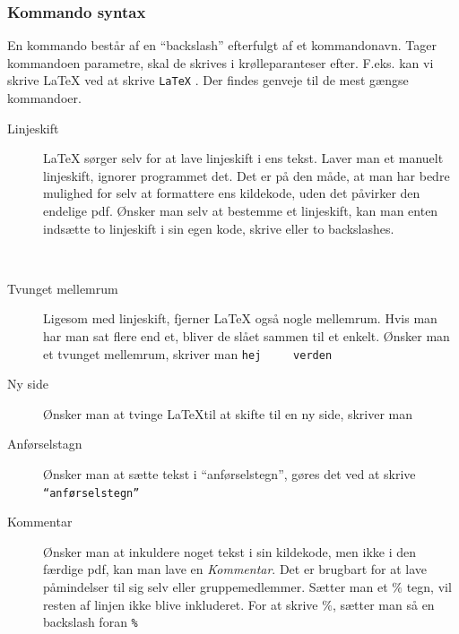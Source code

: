 \documentclass{article}
\newcommand{\tex}[1] {
  \texttt{#1}
}
\begin{document}
   \subsubsection{Kommando syntax}
     En kommando består af en ``backslash'' efterfulgt af et kommandonavn.
     Tager kommandoen parametre, skal de skrives i krølleparanteser
     efter. F.eks. kan vi skrive \LaTeX{} ved at skrive \tex{\LaTeX}. Der findes
     genveje til de mest gængse kommandoer.
     \begin{description}
       \item[Linjeskift] \LaTeX{} sørger selv for at lave linjeskift i ens tekst.
         Laver man et manuelt linjeskift, ignorer programmet det. Det er på den måde, at man har
         bedre mulighed for selv at formattere ens kildekode, uden det påvirker den
         endelige pdf. Ønsker man selv at bestemme et linjeskift, kan man enten indsætte to
         linjeskift i sin egen kode, skrive \tex{\linebreak} eller to backslashes.
         \tex{\\}

       \item[Tvunget mellemrum] Ligesom med linjeskift, fjerner \LaTeX{} også
         nogle mellemrum. Hvis man har man sat flere end et, bliver de slået sammen til et enkelt.
         Ønsker man et tvunget mellemrum, skriver man \tex{hej ~~~ verden}

       \item[Ny side] Ønsker man at tvinge \LaTeX til at skifte til en ny side,
         skriver man \tex{\newpage}

       \item[Anførselstagn] Ønsker man at sætte tekst i ``anførselstegn'', gøres
         det ved at skrive \tex{``anførselstegn''}

       \item[Kommentar] Ønsker man at inkuldere noget tekst i sin kildekode, men
         ikke i den færdige pdf, kan man lave en \emph{Kommentar}. Det er brugbart
         for at lave påmindelser til sig selv eller gruppemedlemmer. Sætter man
         et \(\%\) tegn, vil resten af linjen ikke blive inkluderet. For at
         skrive \(\%\), sætter man så en backslash foran \tex{\%}



\end{description}
\end{document}
